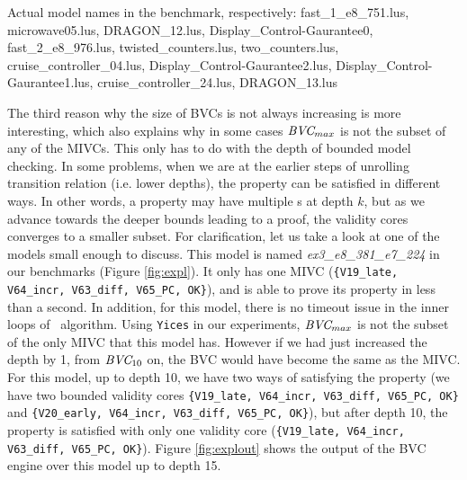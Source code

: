 \begin{table}
\vspace{0.07in}
{\small{Actual model names in the benchmark, respectively: fast\_1\_e8\_751.lus, microwave05.lus, DRAGON\_12.lus, Display\_Control-Gaurantee0, fast\_2\_e8\_976.lus, twisted\_counters.lus, two\_counters.lus, cruise\_controller\_04.lus, Display\_Control-Gaurantee2.lus, Display\_Control-Gaurantee1.lus, cruise\_controller\_24.lus, DRAGON\_13.lus}}
  \label{tab:bvc-abnormal}
\end{table}

The third reason why the size of BVCs is not always increasing is more interesting, which also explains why in some cases $\textit{BVC} _{max}$ is not the subset of any of the MIVCs. This only has to do with the depth of bounded model checking. In some problems, when we are at the earlier steps of unrolling transition relation (i.e. lower depths), the property can be satisfied in different ways. In other words, a property may have multiple \bvc s at depth $k$, but as we advance towards the deeper bounds leading to a proof, the validity cores converges to a smaller subset.
For clarification, let us take a look at one of the models small enough to discuss. This model is named \emph{ex3\_e8\_381\_e7\_224} in our benchmarks (Figure \ref{fig:expl}). It only has one MIVC ({\small{\texttt{\{V19\_late, V64\_incr, V63\_diff, V65\_PC, OK\}}}}), and \jkind is able to prove its property in less than a second. In addition, for this model, there is no timeout issue in the inner loops of \aivcalg\ algorithm. Using \texttt{Yices} in our experiments, $\textit{BVC} _{max}$ is not the subset of the only MIVC that this model has. However if we had just increased the depth by 1, from $\textit{BVC} _{10}$ on, the BVC would have become the same as the MIVC. For this model, up to depth 10, we have two ways of satisfying the property (we have two bounded validity cores {\small{\texttt{\{V19\_late, V64\_incr, V63\_diff, V65\_PC, OK\}}}} and {\small{\texttt{\{V20\_early, V64\_incr, V63\_diff, V65\_PC, OK\}}}}), but after depth 10, the property is satisfied with only one validity core ({\small{\texttt{\{V19\_late, V64\_incr, V63\_diff, V65\_PC, OK\}}}}). Figure \ref{fig:explout} shows the output of the \jkind BVC engine over this model up to depth 15.

